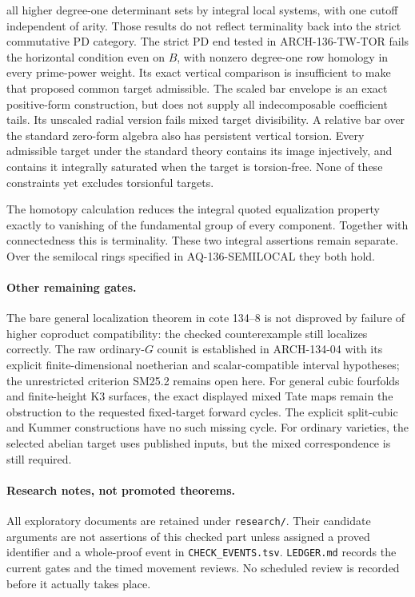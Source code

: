 \documentclass[11pt,a4paper]{article}
\begin{document}
all higher degree-one determinant sets by integral local systems,
with one cutoff independent of arity. Those results do not
reflect terminality back into the strict commutative PD category.
The strict PD end tested in ARCH-136-TW-TOR fails the horizontal
condition even on $B$, with nonzero degree-one row homology in
every prime-power weight. Its exact vertical comparison is
insufficient to make that proposed common target admissible.
The scaled bar envelope is an exact positive-form construction, but
does not supply all indecomposable coefficient tails. Its unscaled
radial version fails mixed target divisibility. A relative bar over
the standard zero-form algebra also has persistent vertical torsion.
Every admissible target under the standard theory contains its image
injectively, and contains it integrally saturated when the target is
torsion-free. None of these constraints yet excludes torsionful targets.

The homotopy calculation reduces the integral quoted equalization
property exactly to vanishing of the fundamental group of every
component. Together with connectedness this is terminality. These
two integral assertions remain separate. Over the semilocal rings
specified in AQ-136-SEMILOCAL they both hold.

\paragraph{Other remaining gates.}
The bare general localization theorem in cote 134--8 is not disproved
by failure of higher coproduct compatibility: the checked counterexample
still localizes correctly. The raw ordinary-$G$ counit is established
in ARCH-134-04 with its explicit finite-dimensional noetherian and
scalar-compatible interval hypotheses; the unrestricted criterion
SM25.2 remains open here. For general cubic fourfolds and finite-height
K3 surfaces, the exact displayed mixed Tate maps remain the obstruction
to the requested fixed-target forward cycles. The explicit split-cubic
and Kummer constructions have no such missing cycle. For ordinary
varieties, the selected abelian target uses published inputs, but the
mixed correspondence is still required.

\paragraph{Research notes, not promoted theorems.}
All exploratory documents are retained under \texttt{research/}.
Their candidate arguments are not assertions of this checked part
unless assigned a proved identifier and a whole-proof event in
\texttt{CHECK\_EVENTS.tsv}. \texttt{LEDGER.md} records the current gates
and the timed movement reviews. No scheduled review is recorded before
it actually takes place.
\end{document}
